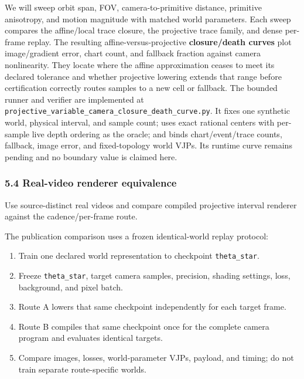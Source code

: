 \documentclass[
]{article}
\providecommand{\tightlist}{%
  \setlength{\itemsep}{0pt}\setlength{\parskip}{0pt}}
\begin{document}
We will sweep orbit span, FOV, camera-to-primitive distance, primitive
anisotropy, and motion magnitude with matched world parameters. Each
sweep compares the affine/local trace closure, the projective trace
family, and dense per-frame replay. The resulting
affine-versus-projective \textbf{closure/death curves} plot
image/gradient error, chart count, and fallback fraction against camera
nonlinearity. They locate where the affine approximation ceases to meet
its declared tolerance and whether projective lowering extends that
range before certification correctly routes samples to a new cell or
fallback. The bounded runner and verifier are implemented at
\texttt{projective\_variable\_camera\_closure\_death\_curve.py}. It
fixes one synthetic world, physical interval, and sample count; uses
exact rational centers with per-sample live depth ordering as the
oracle; and binds chart/event/trace counts, fallback, image error, and
fixed-topology world VJPs. Its runtime curve remains pending and no
boundary value is claimed here.

\begin{table}[t]
\centering
\caption{Bounded variable-camera closure/death curve.}
\label{tab:variable-camera-closure}

\end{table}

\subsubsection{5.4 Real-video renderer
equivalence}\label{real-video-renderer-equivalence}

Use source-distinct real videos and compare compiled projective interval
renderer against the cadence/per-frame route.

The publication comparison uses a frozen identical-world replay
protocol:

\begin{enumerate}
\def\labelenumi{\arabic{enumi}.}
\tightlist
\item
  Train one declared world representation to checkpoint
  \texttt{theta\_star}.
\item
  Freeze \texttt{theta\_star}, target camera samples, precision, shading
  settings, loss, background, and pixel batch.
\item
  Route A lowers that same checkpoint independently for each target
  frame.
\item
  Route B compiles that same checkpoint once for the complete camera
  program and evaluates identical targets.
\item
  Compare images, losses, world-parameter VJPs, payload, and timing; do
  not train separate route-specific worlds.
\end{enumerate}
\end{document}
